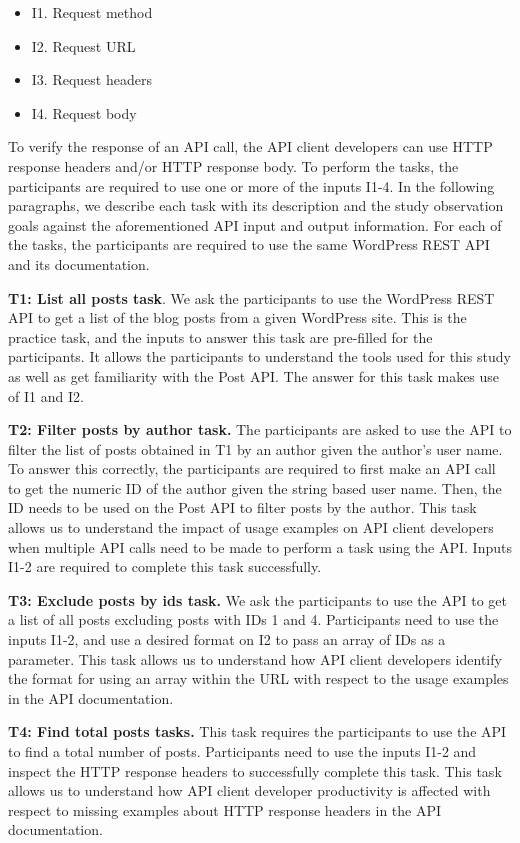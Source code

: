 \documentclass[conference]{IEEEtran}
\begin{document}
\begin{itemize}
  \item I1. Request method
  \item I2. Request URL
  \item I3. Request headers
  \item I4. Request body
\end{itemize}

To verify the response of an API call, the API client developers can use HTTP response headers and/or HTTP response body. To perform the tasks, the participants are required to use one or more of the inputs I1-4. In the following paragraphs, we describe each task with its description and the study observation goals against the aforementioned API input and output information. For each of the tasks, the participants are required to use the same WordPress REST API and its documentation.

\textbf{T1: List all posts task}. We ask the participants to use the WordPress REST API to get a list of the blog posts from a given WordPress site. This is the practice task, and the inputs to answer this task are pre-filled for the participants. It allows the participants to understand the tools used for this study as well as get familiarity with the Post API. The answer for this task makes use of I1 and I2.

\textbf{T2: Filter posts by author task.} The participants are asked to use the API to filter the list of posts obtained in T1 by an author given the author's user name. To answer this correctly, the participants are required to first make an API call to get the numeric ID of the author given the string based user name. Then, the ID needs to be used on the Post API to filter posts by the author. This task allows us to understand the impact of usage examples on API client developers when multiple API calls need to be made to perform a task using the API. Inputs I1-2 are required to complete this task successfully.

\textbf{T3: Exclude posts by ids task.} We ask the participants to use the API to get a list of all posts excluding posts with IDs 1 and 4. Participants need to use the inputs I1-2, and use a desired format on I2 to pass an array of IDs as a parameter. This task allows us to understand how API client developers identify the format for using an array within the URL with respect to the usage examples in the API documentation.

\textbf{T4: Find total posts tasks.} This task requires the participants to use the API to find a total number of posts. Participants need to use the inputs I1-2 and inspect the HTTP response headers to successfully complete this task. This task allows us to understand how API client developer productivity is affected with respect to missing examples about HTTP response headers in the API documentation.
\end{document}
